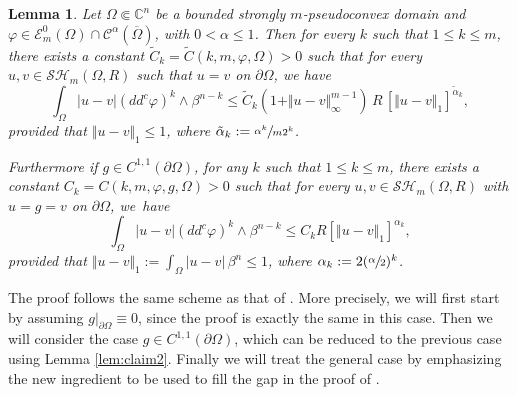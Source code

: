 \documentclass[11pt]{article}
\providecommand{\C}{}
\numberwithin{equation}{section}
\newtheorem{lemma}[theorem]{Lemma}
\theoremstyle{definition}
\renewcommand{\C}{\mathbb{C}}
\theoremstyle{plain}
\theoremstyle{definition}
\begin{document}
\begin{lemma}\label{lem:ModC} Let $\Omega \Subset \C^n$ be a bounded strongly $m$-pseudoconvex domain and $\varphi\in \mathcal{E}^0_m (\Omega)\cap \mathcal{C}^{\alpha} (\overline\Omega)$, with $ 0 < \alpha \leq 1$. Then for every $k$ such that $1 \leq k \leq m$, there exists a constant $\tilde C_k = \tilde C (k,m,\varphi, \Omega) >0$ such that for every $u,v\in \mathcal{SH}_m (\Omega,R)$ such that $u = v$ on $\partial \Omega$, we have
\begin{equation} \label{eq:MocEst2}
\int_{\Omega}|u-v| (dd^c\varphi)^k\wedge\beta^{n-k}\leq \tilde C_k (1 + \Vert u - v\Vert_{\infty}^{m-1}) \, R \, \left[\Vert u-v \Vert_1\right]^{\tilde \alpha_k },
\end{equation}
provided that $\Vert u-v \Vert_1 \leq 1$, where $\tilde \alpha_k := \sfrac{\alpha^k}{m 2^k} $.

Furthermore if $g \in C^{1,1} (\partial \Omega)$, for any $k$ such that $1 \leq k\leq m$, there exists a constant $C_k = C (k,m, \varphi,g,\Omega) > 0$ such that for every $u, v \in \mathcal{SH}_m (\Omega,R)$ with $u = g = v$ on $\partial \Omega$, we~have
\begin{equation} \label{eq:MocEst1}
\int_{\Omega}|u-v|(dd^c\varphi)^k\wedge\beta^{n-k}\leq C_k R \left[\Vert u-v \Vert_1\right]^{\alpha_k},
\end{equation}
provided that $\Vert u-v \Vert_1 := \int_{\Omega} \vert u - v\vert \, \beta^n \leq 1$, where $\alpha_k := 2 (\sfrac{\alpha}{ 2})^k$.
\end{lemma}

The proof follows the same scheme as that of \cite[Lem.\,4.2]{BZ20}. More precisely,
we will first start by assuming $g|_{\partial \Omega} \equiv 0$, since the proof is exactly the same in this case.
Then we will consider the case $g\in C^{1,1} (\partial \Omega)$, which can be reduced to the previous case using Lemma \ref{lem:claim2}.
Finally we will treat the general case by emphasizing the new ingredient to be used to fill the gap in the proof of \cite[Lem.\,4.2]{BZ20}.
\end{document}
